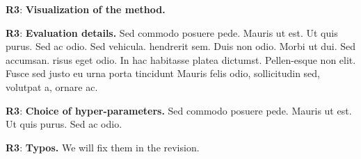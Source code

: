 \documentclass[10pt,twocolumn,letterpaper]{article}
\newcommand{\Rthree}{\vspace{0.0em}\noindent \textcolor[RGB]{0, 128, 0}{\textbf{R3}\hspace{0.0em}}}
\begin{document}
\Rthree: \textbf{Visualization of the method.}
\lipsum[6]

\Rthree: \textbf{Evaluation details.}
Sed commodo posuere pede. Mauris ut est. Ut quis purus. Sed ac odio. Sed vehicula. hendrerit sem. Duis non odio. Morbi ut dui. Sed accumsan. risus eget odio. In hac habitasse platea dictumst. Pellen-esque non elit. Fusce sed justo eu urna porta tincidunt Mauris felis odio, sollicitudin sed, volutpat a, ornare ac.

\Rthree: \textbf{Choice of hyper-parameters.}
Sed commodo posuere pede. Mauris ut est. Ut quis purus. Sed ac odio. 


\Rthree: \textbf{Typos.}
We will fix them in the revision.
\end{document}
